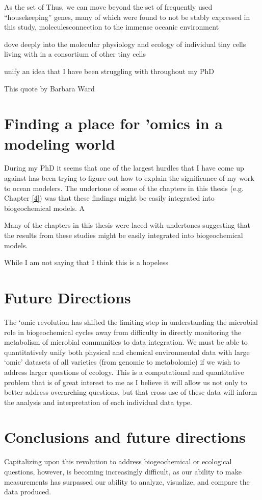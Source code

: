 As the set of Thus, we can move beyond the set of frequently used ``housekeeping'' genes, many of which were found to not be stably expressed in this study, 
moleculesconnection to the immense oceanic environment

dove deeply into the molecular physiology and ecology of individual tiny cells living with in a consortium of other tiny cells  

unify an idea that I have been struggling with throughout my PhD

This quote by Barbara Ward

\section{Finding a place for 'omics in a modeling world}

During my PhD it seems that one of the largest hurdles that I have come up against has been trying to figure out how to explain the significance of my work to ocean modelers. The undertone of some of the chapters in this thesis (e.g. Chapter \ref{4}) was that these findings might be easily integrated into biogeochemical models. A

Many of the chapters in this thesis were laced with undertones suggesting that the results from these studies might be easily integrated into biogeochemical models. 

While I am not saying that I think this is a hopeless 

\section{Future Directions}


The ‘omic revolution has shifted the limiting step in understanding the microbial role in biogeochemical cycles away from difficulty in directly monitoring the metabolism of microbial communities to data integration. We must be able to quantitatively unify both physical and chemical environmental data with large ‘omic’ datasets of all varieties (from genomic to metabolomic) if we wish to address larger questions of ecology. This is a computational and quantitative problem that is of great interest to me as I believe it will allow us not only to better address overarching questions, but that cross use of these data will inform the analysis and interpretation of each individual data type. 


\section{Conclusions and future directions}
Capitalizing upon this revolution to address biogeochemical or ecological questions, however, is becoming increasingly difficult, as our ability to make measurements has surpassed our ability to analyze, visualize, and compare the data produced.



